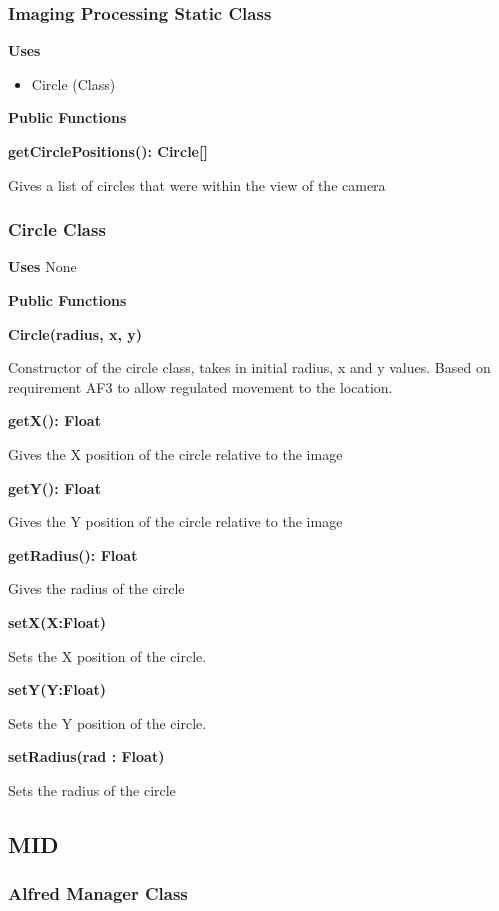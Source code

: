 \documentclass [10pt]{article}
\begin{document}
\subsubsection{Imaging Processing Static Class}
\textbf{Uses}
\begin{itemize}
	\item Circle (Class)
\end{itemize}

\textbf{Public Functions}

\textbf{getCirclePositions(): Circle[]}

Gives a list of circles that were within the view of the camera

\subsubsection{Circle Class}

\textbf{Uses}
None

\textbf{Public Functions}

\textbf{Circle(radius, x, y)}

Constructor of the circle class, takes in initial radius, x and y values. Based on requirement AF3 to allow regulated movement to the location.

\textbf{getX(): Float}

Gives the X position of the circle relative to the image

\textbf{getY(): Float}

Gives the Y position of the circle relative to the image

\textbf{getRadius(): Float}

Gives the radius of the circle

\textbf{setX(X:Float)}

Sets the X position of the circle.

\textbf{setY(Y:Float)}

Sets the Y position of the circle.

\textbf{setRadius(rad : Float)}

Sets the radius of the circle

\subsection{MID}

\subsubsection{Alfred Manager Class}
\end{document}
